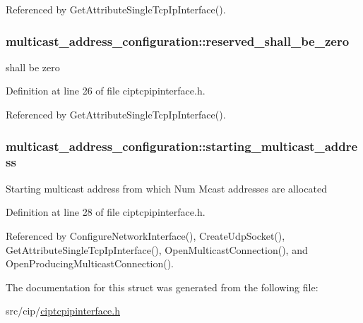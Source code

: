 \-Referenced by \-Get\-Attribute\-Single\-Tcp\-Ip\-Interface().

\hypertarget{structmulticast__address__configuration_a5cec3a9e7c718c0b875ce9d0dde82f56}{
\subsubsection[{reserved\-\_\-shall\-\_\-be\-\_\-zero}]{ {\bf multicast\-\_\-address\-\_\-configuration\-::reserved\-\_\-shall\-\_\-be\-\_\-zero}}}\label{db/dd7/structmulticast__address__configuration_a5cec3a9e7c718c0b875ce9d0dde82f56}
shall be zero 

\-Definition at line 26 of file ciptcpipinterface.\-h.



\-Referenced by \-Get\-Attribute\-Single\-Tcp\-Ip\-Interface().

\hypertarget{structmulticast__address__configuration_a983b98b7087072214bc4fc803b938df3}{
\subsubsection[{starting\-\_\-multicast\-\_\-address}]{ {\bf multicast\-\_\-address\-\_\-configuration\-::starting\-\_\-multicast\-\_\-address}}}\label{db/dd7/structmulticast__address__configuration_a983b98b7087072214bc4fc803b938df3}
\-Starting multicast address from which \-Num \-Mcast addresses are allocated 

\-Definition at line 28 of file ciptcpipinterface.\-h.



\-Referenced by \-Configure\-Network\-Interface(), \-Create\-Udp\-Socket(), \-Get\-Attribute\-Single\-Tcp\-Ip\-Interface(), \-Open\-Multicast\-Connection(), and \-Open\-Producing\-Multicast\-Connection().



\-The documentation for this struct was generated from the following file\-:\begin{DoxyCompactItemize}
\item 
src/cip/\hyperlink{ciptcpipinterface_8h}{ciptcpipinterface.\-h}\end{DoxyCompactItemize}
